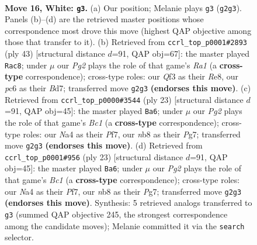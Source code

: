 \documentclass[11pt]{article}
\begin{document}
\clearpage

\begin{figure}[p]\centering
\begin{subfigure}{0.46\textwidth}\centering
\resizebox{\linewidth}{!}{%
\newchessgame
\chessboard[
  setfen={rnb3kr/1p1n4/2p1p3/p2p3p/N2P3q/5Q2/PPP2NPP/2KR1B1R w - - 0 16},
  showmover=false,
  pgfstyle=straightmove, color=movearrow, markmove={g2-g3}
]}
\caption{}
\end{subfigure}\hfill
\begin{subfigure}{0.46\textwidth}\centering
\resizebox{\linewidth}{!}{%
\newchessgame
\chessboard[
  setfen={r3r1k1/1p1b1ppp/3q1n2/p2p4/3Q4/3P1B2/PPP1NRPP/3R2K1 b - - 5 22},
  showmover=false,
  pgfstyle=straightmove, color=movearrow, markmove={a8-c8}
]}
\caption{}
\end{subfigure}
\\[4pt]
\begin{subfigure}{0.46\textwidth}\centering
\resizebox{\linewidth}{!}{%
\newchessgame
\chessboard[
  setfen={rnbq1rk1/5ppp/4pn2/pQ6/2pP4/5NP1/1P2PPBP/RN2K2R b KQ - 0 12},
  showmover=false,
  pgfstyle=straightmove, color=movearrow, markmove={c8-a6}
]}
\caption{}
\end{subfigure}\hfill
\begin{subfigure}{0.46\textwidth}\centering
\resizebox{\linewidth}{!}{%
\newchessgame
\chessboard[
  setfen={rnbq1rk1/5ppp/4pn2/pQ6/2pP4/5NP1/1P2PPBP/RN2K2R b KQ - 0 12},
  showmover=false,
  pgfstyle=straightmove, color=movearrow, markmove={c8-a6}
]}
\caption{}
\end{subfigure}
\caption{\textbf{Move 16, White: \texttt{g3}.} (a) Our position; Melanie plays \texttt{g3} (\texttt{g2g3}). Panels (b)--(d) are the retrieved master positions whose correspondence most drove this move (highest QAP objective among those that transfer to it). (b) Retrieved from \texttt{ccrl\_top\_p0001\#2893} (ply 43) [structural distance $d$=91, QAP obj=67]: the master played \texttt{Rac8}; under $\mu$ our \emph{Pg2} plays the role of that game's \emph{Ra1} (a \textbf{cross-type} correspondence); cross-type roles: our \emph{Q}f3 as their \emph{R}e8, our \emph{p}c6 as their \emph{B}d7; transferred move \texttt{g2g3} \textbf{(endorses this move)}. (c) Retrieved from \texttt{ccrl\_top\_p0000\#3544} (ply 23) [structural distance $d$=91, QAP obj=45]: the master played \texttt{Ba6}; under $\mu$ our \emph{Pg2} plays the role of that game's \emph{Bc1} (a \textbf{cross-type} correspondence); cross-type roles: our \emph{N}a4 as their \emph{P}f7, our \emph{n}b8 as their \emph{P}g7; transferred move \texttt{g2g3} \textbf{(endorses this move)}. (d) Retrieved from \texttt{ccrl\_top\_p0001\#956} (ply 23) [structural distance $d$=91, QAP obj=45]: the master played \texttt{Ba6}; under $\mu$ our \emph{Pg2} plays the role of that game's \emph{Bc1} (a \textbf{cross-type} correspondence); cross-type roles: our \emph{N}a4 as their \emph{P}f7, our \emph{n}b8 as their \emph{P}g7; transferred move \texttt{g2g3} \textbf{(endorses this move)}. Synthesis: 5 retrieved analogs transferred to \texttt{g3} (summed QAP objective 245, the strongest correspondence among the candidate moves); Melanie committed it via the \texttt{search} selector.}
\label{fig:thought-m30}
\end{figure}
\end{document}
